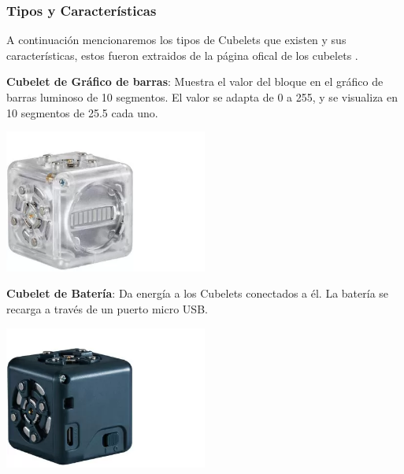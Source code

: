 \subsubsection{Tipos y Caracter\'isticas}
\label{subsubsection:tiposYCaractCubelets}
    A continuaci\'on mencionaremos los tipos de Cubelets que existen y sus caracter\'isticas, estos fueron extraidos de la p\'agina ofical de los
        cubelets \cite{modrobotics2023}.
    \begin{itemize}
        \begin{minipage}
            {0.5\textwidth}
            \item \textbf{Cubelet de Gr\'afico de barras}: Muestra el valor del bloque en el gr\'afico
                de barras luminoso de 10 segmentos. El valor se adapta de 0 a 255, y se visualiza en 10 
                segmentos de 25.5 cada uno.
        \end{minipage}
        \begin{minipage}
            {0.5\textwidth}
            \centering
            \includegraphics[width=0.5\textwidth]{./images/marco_teorico/cubelets/graficoDeBarras.png}
        \end{minipage}
        \begin{minipage}
            {0.5\textwidth}
            \item \textbf{Cubelet de Bater\'ia}: Da energ\'ia a los Cubelets conectados a \'el. 
                La bater\'ia se recarga a trav\'es de un puerto micro USB.
        \end{minipage}
        \begin{minipage}
            {0.5\textwidth}
            \centering
            \includegraphics[width=0.5\textwidth]{./images/marco_teorico/cubelets/bateria.png}

\end{minipage}
\end{itemize}
